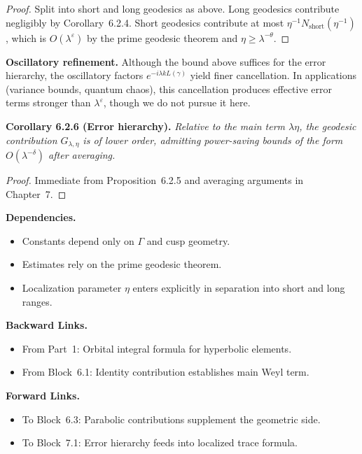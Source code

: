 \begin{proof}
Split into short and long geodesics as above.
Long geodesics contribute negligibly by Corollary~6.2.4.
Short geodesics contribute at most $\eta^{-1} N_{\text{short}}(\eta^{-1})$,
which is $O(\lambda^\varepsilon)$ by the prime geodesic theorem and $\eta \ge \lambda^{-\theta}$.
\end{proof}

\medskip

\noindent\textbf{Oscillatory refinement.}
Although the bound above suffices for the error hierarchy,
the oscillatory factors $e^{-i\lambda kL(\gamma)}$
yield finer cancellation.
In applications (variance bounds, quantum chaos),
this cancellation produces effective error terms stronger than $\lambda^\varepsilon$,
though we do not pursue it here.

\medskip

\noindent\textbf{Corollary 6.2.6 (Error hierarchy).}
\emph{Relative to the main term $\lambda\eta$,
the geodesic contribution $G_{\lambda,\eta}$ is of lower order,
admitting power-saving bounds of the form $O(\lambda^{-\delta})$ after averaging.}

\begin{proof}
Immediate from Proposition~6.2.5 and averaging arguments in Chapter~7.
\end{proof}

\medskip

\noindent\textbf{Dependencies.}
\begin{itemize}
  \item Constants depend only on $\Gamma$ and cusp geometry.
  \item Estimates rely on the prime geodesic theorem.
  \item Localization parameter $\eta$ enters explicitly in separation into short and long ranges.
\end{itemize}

\medskip

\noindent\textbf{Backward Links.}
\begin{itemize}
  \item From Part~1: Orbital integral formula for hyperbolic elements.
  \item From Block~6.1: Identity contribution establishes main Weyl term.
\end{itemize}

\medskip

\noindent\textbf{Forward Links.}
\begin{itemize}
  \item To Block~6.3: Parabolic contributions supplement the geometric side.
  \item To Block~7.1: Error hierarchy feeds into localized trace formula.
\end{itemize}


